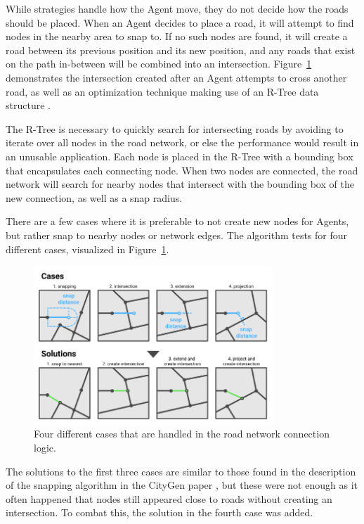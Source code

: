 
While strategies handle how the Agent move, they do not decide how the roads should be placed.
When an Agent decides to place a road, it will attempt to find nodes in the nearby area to snap to.
If no such nodes are found, it will create a road between its previous position and its new position, and any roads that exist on the path in-between will be combined into an intersection.
Figure~\ref{fig:road_connection_cases} demonstrates the intersection created after an Agent attempts to cross another road, as well as an optimization technique making use of an R-Tree data structure \cite{wiki:R-tree}.

The R-Tree is necessary to quickly search for intersecting roads by avoiding to iterate over all nodes in the road network, or else the performance would result in an unusable application.
Each node is placed in the R-Tree with a bounding box that encapsulates each connecting node.
When two nodes are connected, the road network will search for nearby nodes that intersect with the bounding box of the new connection, as well as a snap radius.

There are a few cases where it is preferable to not create new nodes for Agents, but rather snap to nearby nodes or network edges.
The algorithm tests for four different cases, visualized in Figure~\ref{fig:road_connection_cases}.

\begin{figure}[H]
  \centering

  \includegraphics[width=0.8\textwidth]{figure/road_connection_cases.png}
  \caption{Four different cases that are handled in the road network connection logic.}

  \label{fig:road_connection_cases}
\end{figure}

The solutions to the first three cases are similar to those found in the description of the snapping algorithm in the CityGen paper \cite[p. 6]{citygen_paper}, but these were not enough as it often happened that nodes still appeared close to roads without creating an intersection.
To combat this, the solution in the fourth case was added.

